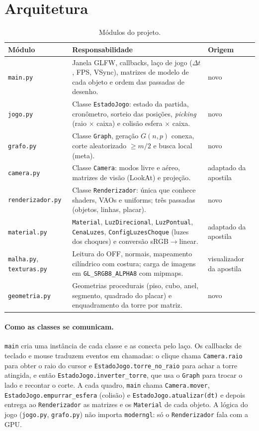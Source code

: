 \documentclass[a4paper,11pt]{article}
\newcommand{\arq}[1]{\texttt{#1}}
\begin{document}
\section{Arquitetura}
\begin{table}[H]
\centering\small
\begin{tabularx}{\linewidth}{@{}lYl@{}}
\toprule
\textbf{Módulo} & \textbf{Responsabilidade} & \textbf{Origem} \\
\midrule
\arq{main.py} & Janela GLFW, callbacks, laço de jogo ($\Delta t$, FPS, VSync), matrizes de modelo de cada objeto e ordem das passadas de desenho. & novo \\
\arq{jogo.py} & Classe \texttt{EstadoJogo}: estado da partida, cronômetro, sorteio das posições, \emph{picking} (raio $\times$ caixa) e colisão esfera $\times$ caixa. & novo \\
\arq{grafo.py} & Classe \texttt{Graph}, geração $G(n,p)$ conexa, corte aleatorizado $\ge m/2$ e busca local (meta). & novo \\
\arq{camera.py} & Classe \texttt{Camera}: modos livre e aéreo, matrizes de visão (LookAt) e projeção. & adaptado da apostila \\
\arq{renderizador.py} & Classe \texttt{Renderizador}: única que conhece shaders, VAOs e uniforms; três passadas (objetos, linhas, placar). & novo \\
\arq{material.py} & \texttt{Material}, \texttt{LuzDirecional}, \texttt{LuzPontual}, \texttt{CenaLuzes}, \texttt{ConfigLuzesChoque} (luzes dos choques) e conversão sRGB$\to$linear. & adaptado da apostila \\
\arq{malha.py}, \arq{texturas.py} & Leitura do OFF, normais, mapeamento cilíndrico com costura; carga de imagens em \texttt{GL\_SRGB8\_ALPHA8} com mipmaps. & visualizador da apostila \\
\arq{geometria.py} & Geometrias procedurais (piso, cubo, anel, segmento, quadrado do placar) e enquadramento da torre por matriz. & novo \\
\bottomrule
\end{tabularx}
\caption{Módulos do projeto.}
\end{table}

\paragraph{Como as classes se comunicam.} \texttt{main} cria uma instância de
cada classe e as conecta pelo laço. Os callbacks de teclado e mouse traduzem
eventos em chamadas: o clique chama \texttt{Camera.raio} para obter o raio do
cursor e \texttt{EstadoJogo.torre\_no\_raio} para achar a torre atingida, e então
\texttt{EstadoJogo.inverter\_torre}, que usa o \texttt{Graph} para trocar o lado
e recontar o corte. A cada quadro, \texttt{main} chama \texttt{Camera.mover},
\texttt{EstadoJogo.empurrar\_esfera} (colisão) e \texttt{EstadoJogo.atualizar(dt)}
e depois entrega ao \texttt{Renderizador} as matrizes e os \texttt{Material}
de cada objeto. A lógica do jogo (\arq{jogo.py}, \arq{grafo.py}) não importa
\texttt{moderngl}: só o \texttt{Renderizador} fala com a GPU.
\end{document}
